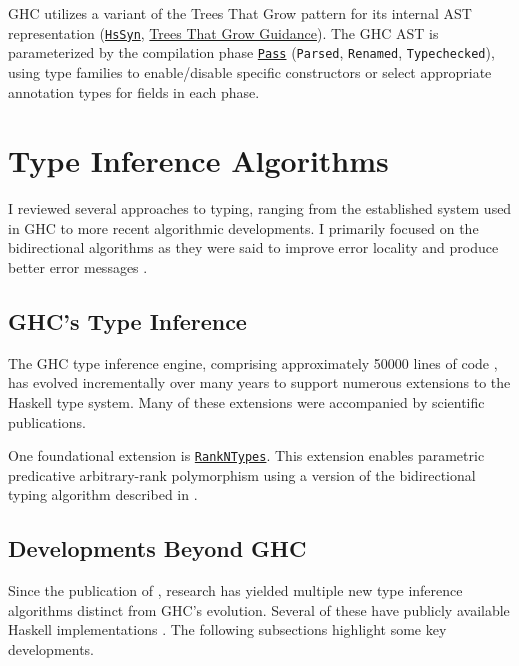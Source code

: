 GHC utilizes a variant of the Trees That Grow pattern \cite{trees-that-grow-2016} for its internal AST representation (\href{https://gitlab.haskell.org/ghc/ghc/-/wikis/implementing-trees-that-grow/hs-syn}{\texttt{HsSyn}}, \href{https://gitlab.haskell.org/ghc/ghc/-/wikis/implementing-trees-that-grow/trees-that-grow-guidance}{Trees That Grow Guidance}). The GHC AST is parameterized by the compilation phase \href{https://github.com/ghc/ghc/blob/ed38c09bd89307a7d3f219e1965a0d9743d0ca73/compiler/GHC/Hs/Extension.hs#L169}{\texttt{Pass}} (\texttt{Parsed}, \texttt{Renamed}, \texttt{Typechecked}), using type families to enable/disable specific constructors or select appropriate annotation types for fields in each phase.

\section{Type Inference Algorithms}
\label{sec:TypeInferenceAlgorithm}

I reviewed several approaches to typing, ranging from the established system used in GHC to more recent algorithmic developments. I primarily focused on the bidirectional algorithms as they were said to improve error locality and produce better error messages \cite{dunfield-bidirectional-2020}.

\subsection{GHC's Type Inference}

The GHC type inference engine, comprising approximately 50000 lines of code \cite{jones-typechecker-2023}, has evolved incrementally over many years to support numerous extensions to the Haskell type system. Many of these extensions were accompanied by scientific publications.

One foundational extension is \href{https://gitlab.haskell.org/haskell/prime/-/wikis/RankNTypes}{\texttt{RankNTypes}}. This extension enables parametric predicative arbitrary-rank polymorphism using a version of the bidirectional typing algorithm described in \cite{jones-practical-2007}.

\subsection{Developments Beyond GHC}

Since the publication of \cite{jones-practical-2007}, research has yielded multiple new type inference algorithms distinct from GHC's evolution. Several of these have publicly available Haskell implementations \cite{github-goldenberg-artem-goldenbergbidirectionalsystem-2025, github-choi-kwanghoonbidi-2025, github-chen-cu1ch3ntype-inference-zoo-2025}. The following subsections highlight some key developments.

